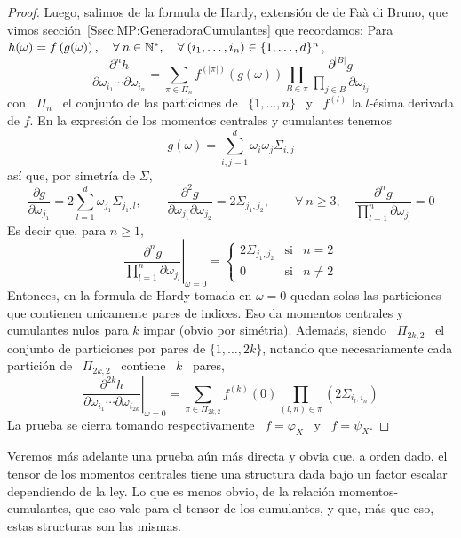 \begin{proof}
  Luego, salimos de  la formula de Hardy, extensi\'on de de  Fa\`a di Bruno, que
  vimos  secci\'on~\ref{Ssec:MP:GeneradoraCumulantes}  que  recordamos:  Para  \
  $h(\omega) = f\left( g(\omega) \right),  \quad \forall \: n \in \mathbb{N}^*, \quad
  \forall \: (i_1 , \ldots , i_n ) \in \{ 1 , \ldots , d \}^n$,
  \[
  \frac{\partial^n  h}{\partial  \omega_{i_1}  \cdots \partial  \omega_{i_n}}  =
  \sum_{\pi  \in \Pi_n}  f^{(|\pi|)}\left( g(\omega)  \right) \prod_{B  \in \pi}
  \frac{\partial^{|B|} g}{\displaystyle \prod_{j \in B} \partial \omega_{i_j}}
  \]
  con \ $\Pi_n$ \ el conjunto de las particiones de \ $\{ 1 , \ldots , n \}$ \ y
  \ $f^{(l)}$ la $l$-\'esima derivada de $f$.  En la expresi\'on de los momentos
  centrales y cumulantes tenemos
  \[
  g(\omega) = \sum_{i,j=1}^d \omega_i \omega_j \Sigma_{i,j}
  \]
  as\'i que, por simetr\'ia de $\Sigma$,
  \[
  \frac{\partial  g}{\partial   \omega_{j_1}}  =  2   \sum_{l=1}^d  \omega_{j_1}
  \Sigma_{j_1,l},  \qquad  \frac{\partial^2  g}{\partial  \omega_{j_1}  \partial
    \omega_{j_2}}  =  2 \Sigma_{j_1,j_2},  \qquad  \forall  \:  n \ge  3,  \quad
  \frac{\partial^n g}{\prod_{l=1}^n \partial \omega_{j_l}} = 0
  \]
  Es decir que, para $n \ge 1$,
  \[
  \left.      \frac{\partial^n    g}{\prod_{l=1}^n     \partial    \omega_{j_l}}
  \right|_{\omega = 0} = \left\{\begin{array}{ccl}
  2   \Sigma_{j_1,j_2} & \mbox{si} & n = 2\\[2mm]
  0 & \mbox{si} & n \ne 2
  \end{array}\right.
  \]
  Entonces,  en la formula  de Hardy  tomada en  $\omega =  0$ quedan  solas las
  particiones  que  contienen unicamente  pares  de  indices.   Eso da  momentos
  centrales y cumulantes nulos para $k$ impar (obvio por sim\'etria). Adema\'as,
  siendo \  $\Pi_{2 k , 2}$  \ el conjunto de  particiones por pares de  $\{ 1 ,
  \ldots , 2 k \}$, notando que necesariamente cada partici\'on de \ $\Pi_{2 k ,
    2}$ \ contiene \ $k$ \ pares,
  \[
  \left.   \frac{\partial^{2  k}   h}{\partial   \omega_{i_1}  \cdots   \partial
      \omega_{i_{2  k}}}\right|_{\omega =  0} =  \sum_{\pi  \in \Pi_{2  k ,  2}}
  f^{(k)}(0) \prod_{(l,n) \in \pi} \left( 2 \Sigma_{i_l,i_n} \right)
  \]
  La prueba  se cierra  tomando respectivamente  \ $f =  \varphi_X$ \  y \  $f =
  \psi_X$.
\end{proof}
%
Veremos m\'as adelante una prueba a\'un m\'as directa y obvia que, a orden dado,
el tensor  de los  momentos centrales  tiene una structura  dada bajo  un factor
escalar  dependiendo  de la  ley.   Lo  que es  menos  obvio,  de la  relaci\'on
momentos-cumulantes, que eso vale para el tensor de los cumulantes, y que, m\'as
que eso, estas structuras son las mismas.

